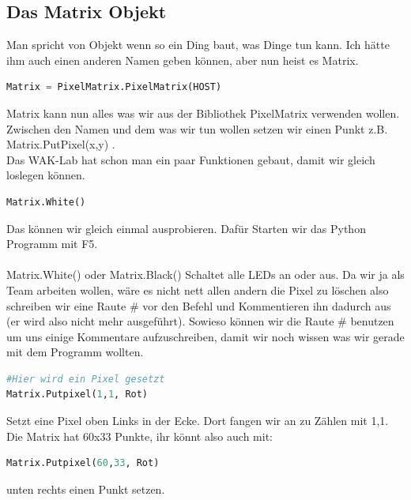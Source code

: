 \subsection{\large{Das Matrix Objekt}}
Man spricht von Objekt wenn so ein Ding baut, was Dinge tun kann. Ich hätte ihm auch einen anderen Namen geben können, aber nun heist es Matrix. \\
\begin{lstlisting}[language=Python, caption=Das Matrix Objekt]
Matrix = PixelMatrix.PixelMatrix(HOST)
\end{lstlisting}
Matrix kann nun alles was wir aus der Bibliothek PixelMatrix verwenden wollen. Zwischen den Namen und dem was wir tun wollen setzen wir einen Punkt z.B. Matrix.PutPixel(x,y) .\\
Das WAK-Lab hat schon man ein paar Funktionen gebaut, damit wir gleich loslegen können.\\
\begin{lstlisting}[language=Python, caption=Matrix Löschen]
Matrix.White()
\end{lstlisting}
Das können wir gleich einmal ausprobieren. Dafür Starten wir das Python Programm mit F5.\\
\ \\
Matrix.White() oder Matrix.Black() Schaltet alle LEDs an oder aus. Da wir ja als Team arbeiten wollen, wäre es nicht nett allen andern die Pixel zu löschen also schreiben wir eine Raute \# vor den Befehl und Kommentieren ihn dadurch aus (er wird also nicht mehr ausgeführt). Sowieso können wir die Raute \# benutzen um uns einige Kommentare aufzuschreiben, damit wir noch wissen was wir gerade mit dem Programm wollten.\\
\begin{lstlisting}[language=Python, caption=Einen Pixel setzen]
#Hier wird ein Pixel gesetzt
Matrix.Putpixel(1,1, Rot)
\end{lstlisting}
Setzt eine Pixel oben Links in der Ecke. Dort fangen wir an zu Zählen mit 1,1. Die Matrix hat 60x33 Punkte, ihr könnt also auch mit: \begin{lstlisting}[language=Python, caption=Noch einen Pixel setzen]
Matrix.Putpixel(60,33, Rot)
\end{lstlisting}
unten rechts einen Punkt setzen.\\
